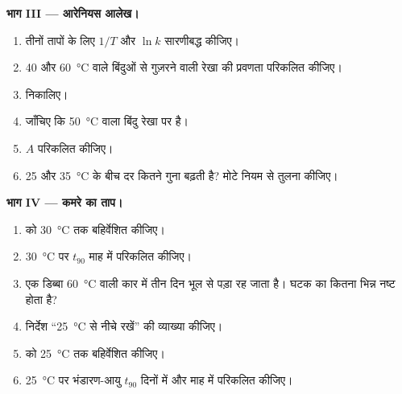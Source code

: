 \begin{problem}
\medskip
\noindent\textbf{भाग III --- आरेनियस आलेख।}
\begin{enumerate}[resume]
  \item तीनों तापों के लिए $1/T$ और $\ln k$ सारणीबद्ध कीजिए।
  \item 40 और
        \qty{60}{\celsius} वाले बिंदुओं से गुज़रने वाली रेखा की प्रवणता परिकलित कीजिए।
  \item {} निकालिए।
  \item जाँचिए कि \qty{50}{\celsius} वाला बिंदु रेखा पर है।
  \item {} $A$ परिकलित कीजिए।
  \item 25 और \qty{35}{\celsius} के बीच दर कितने गुना बढ़ती है?
        मोटे नियम से तुलना कीजिए।
\end{enumerate}

\medskip
\noindent\textbf{भाग IV --- कमरे का ताप।}
\begin{enumerate}[resume]
  \item {} को \qty{30}{\celsius} तक बहिर्वेशित कीजिए।
  \item \qty{30}{\celsius} पर $t_{90}$ माह में परिकलित कीजिए।
  \item एक डिब्बा \qty{60}{\celsius} वाली कार में तीन दिन भूल से पड़ा रह जाता है। घटक का
        कितना भिन्न नष्ट होता है?
  \item निर्देश ``\qty{25}{\celsius} से नीचे रखें'' की व्याख्या कीजिए।
  \item {} को \qty{25}{\celsius} तक बहिर्वेशित कीजिए।
  \item \qty{25}{\celsius} पर भंडारण-आयु $t_{90}$ दिनों में और
        माह में परिकलित कीजिए।
\end{enumerate}
\end{problem}
